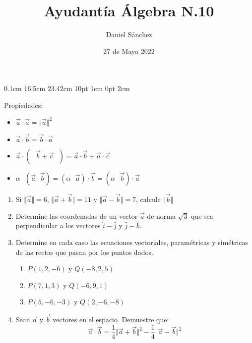 \documentclass[12pt]{article}
\begin{document}
\setmargins{2.5cm}
{0.1cm}
{16.5cm}
{23.42cm}
{10pt}
{1cm}
{0pt}
{2cm}

\title{Ayudant\'ia \'Algebra N.10}
\date{27 de Mayo 2022}
\author{Daniel S\'anchez}
\maketitle

Propiedades:

\begin{itemize}
      \item $\vec{a} \cdot \vec{a} = \Vert \vec{a} \Vert ^2$
      \item $\vec{a} \cdot \vec{b} = \vec{b} \cdot \vec{a}$
      \item $\vec{a} \cdot (\mbox{ }\vec{b} + \vec{c}\mbox{ }) = \vec{a} \cdot \vec{b} + \vec{a} \cdot \vec{c}$
      \item $\alpha \mbox{ }(\vec{a}\cdot \vec{b}) = (\alpha \mbox{ }\vec{a})\cdot \vec{b} = (\alpha \mbox{ }\vec{b})\cdot \vec{a}$
\end{itemize}


\begin{enumerate}
      \item Si $\Vert \vec{a} \Vert = 6$, $\Vert \vec{a}+\vec{b} \Vert = 11$
            y $\Vert \vec{a} - \vec{b} \Vert = 7$, calcule $\Vert \vec{b} \Vert$
      \item Determine las coordenadas de un vector $\vec{a}$ de norma $\sqrt{3}$
            que sea perpendicular a los vectores $\hat{i} - \hat{j}$
            y $\hat{j} - \hat{k}$.
      \item Determine en cada caso las ecuaciones vectoriales, param\'etricas y
            sim\'etricas de las rectas que pasan por los puntos dados.
            \begin{enumerate}
                  \item $P(1,2,-6)$ y $Q(-8,2,5)$
                  \item $P(7,1,3)$ y $Q(-6,9,1)$
                  \item $P(5,-6,-3)$ y $Q(2,-6,-8)$
            \end{enumerate}
      \item Sean $\vec{a}$ y $\vec{b}$ vectores en el espacio. Demuestre que:
            $$\vec{a}\cdot \vec{b} = \frac{1}{4}\Vert \vec{a} + \vec{b}\Vert ^2 - \frac{1}{4}\Vert \vec{a} - \vec{b}\Vert ^2$$
\end{enumerate}
\end{document}

